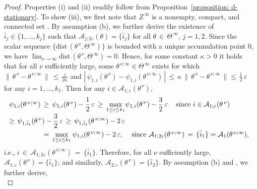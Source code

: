 \documentclass{siamart}
\newcommand{\epc}{\hspace{1pc}}
\begin{document}
\begin{proof}
Properties (i) and (ii) readily follow from Proposition~\ref{proposition: d-stationary}.
To show (iii), we first note %
that $Z^{\,\infty}$ is a nonempty, compact, and connected set \cite[Proposition 8.3.9]{FacchineiPang2003}.
By assumption (b), we further derive the existence of $\bar{i}_j\in \{1, \ldots, k_j\}$ such
that $\mathcal{A}_{j;2\varepsilon}(\theta) = \{\bar{i}_j\}$ for all $\theta\,\in\, \Theta^{\,\infty}$, $j=1,2$.
Since the scalar sequence $\{\mbox{dist}\,(\theta^{\,\nu}, \Theta^{\,\infty})\}$ is bounded with a unique accumulation point $0$,
we have $\displaystyle\lim_{\nu\to \infty}\mbox{dist}\,(\theta^{\,\nu}, \Theta^{\,\infty}) = 0$.
Hence, for some constant $\kappa>0$ it holds that for all $\nu$ sufficiently large, some $\theta^{\,\nu;\infty}\in \Theta^{\,\infty}$ exists
for which $\|\,\theta^{\,\nu}-\theta^{\,\nu;\infty}\,\|\,\leq\, \displaystyle\frac{\varepsilon}{2\kappa}$ and
$|\,\psi_{1,{i}}(\theta^{\,\nu}) - \psi_{1,{i}}(\theta^{\,\nu;\infty})\,| \,\leq \, \kappa\,\|\,\theta^{\,\nu}-\theta^{\,\nu;\infty}\,\|\leq \,
\displaystyle\frac{1}{2}\,\varepsilon$ for any $i=1,\ldots, k_1$. Then for any ${i}\in \mathcal{A}_{1;\varepsilon}(\theta^{\,\nu})$,
$$\begin{array}{ll}
\psi_{1,{i}}(\theta^{\,\nu;\infty}) \,\geq \, \psi_{1, {i}}(\theta^{\,\nu}) -\displaystyle \frac{1}{2}\,\varepsilon\,\geq\,
\displaystyle{\max_{1\leq i\leq k_1}}\psi_{1, i}(\theta^{\,\nu}) - \frac{3}{2}\,\varepsilon\epc \mbox{since $i\in \mathcal{A}_{1;\varepsilon}(\theta^{\,\nu})$}\\[0.1in]
\geq\, \displaystyle\psi_{1, \bar{i}_1}(\theta^{\,\nu}) - \frac{3}{2}\,\varepsilon  \,\geq\, \psi_{1, \bar{i}_1}(\theta^{\,\nu;\infty})-2\,\varepsilon\\[0.1in]
\qquad\qquad\quad=\, \displaystyle\max_{1\leq i\leq k_1}\psi_{1, i}(\theta^{\,\nu;\infty})-2\,\varepsilon ,
\epc \mbox{since $ \mathcal{A}_{1;2\varepsilon}(\theta^{\,\nu;\infty})
\, = \, \{\bar{i}_1\}=\mathcal{A}_{1}(\theta^{\,\nu;\infty})$},
\end{array}
$$
i.e., ${i}\,\in\, \mathcal{A}_{1;2\varepsilon}(\theta^{\,\nu;\infty}) \,= \,\{\bar{i}_1\}$. Therefore, for all  $\nu$ sufficiently large,  $\mathcal{A}_{1;\varepsilon}(\theta^{\,\nu}) = \{\bar{i}_1\}$; and similarly, $\mathcal{A}_{2;\varepsilon}(\theta^{\,\nu}) = \{\bar{i}_2\}$.
By assumption (b) and \cite[Exercise 10.10]{RockafellarRWets98}, we further derive,
 \begin{equation}\label{proof:KL1}

\end{equation}
\end{proof}
\end{document}
